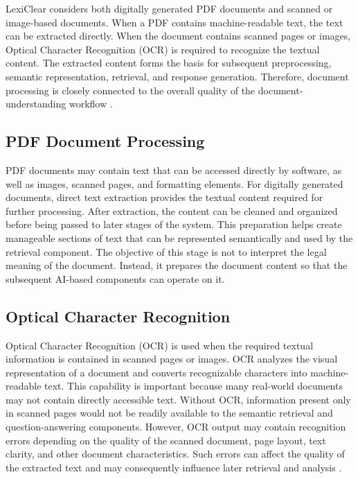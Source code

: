\documentclass[12pt,a4paper,oneside]{report}
\begin{document}
LexiClear considers both digitally generated PDF documents and scanned or
image-based documents. When a PDF contains machine-readable text, the text
can be extracted directly. When the document contains scanned pages or
images, Optical Character Recognition (OCR) is required to recognize the
textual content. The extracted content forms the basis for subsequent preprocessing,
semantic representation, retrieval, and response generation. Therefore,
document processing is closely connected to the overall quality of the
document-understanding workflow \cite{pramanik2025}.

\subsection{PDF Document Processing}

PDF documents may contain text that can be accessed directly by software, as
well as images, scanned pages, and formatting elements. For digitally
generated documents, direct text extraction provides the textual content
required for further processing. After extraction, the content can be cleaned and organized before being
passed to later stages of the system. This preparation helps create
manageable sections of text that can be represented semantically and used by
the retrieval component. The objective of this stage is not to interpret the legal meaning of the
document. Instead, it prepares the document content so that the subsequent
AI-based components can operate on it.

\subsection{Optical Character Recognition}

Optical Character Recognition (OCR) is used when the required textual
information is contained in scanned pages or images. OCR analyzes the visual
representation of a document and converts recognizable characters into
machine-readable text. This capability is important because many real-world documents may not
contain directly accessible text. Without OCR, information present only in
scanned pages would not be readily available to the semantic retrieval and
question-answering components. However, OCR output may contain recognition errors depending on the quality
of the scanned document, page layout, text clarity, and other document
characteristics. Such errors can affect the quality of the extracted text
and may consequently influence later retrieval and analysis \cite{pramanik2025}.
\end{document}

